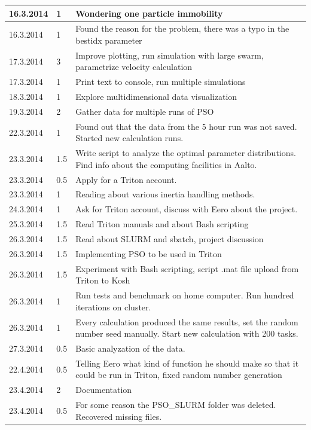 \documentclass[twoside]{article}
\begin{document}
\begin{longtable}{ | l | l | p{10cm} | }
	16.3.2014 & 1 & Wondering one particle immobility \\ \hline
	16.3.2014 & 1 & Found the reason for the problem, there was a typo in the bestidx parameter \\ \hline
	17.3.2014 & 3 & Improve plotting, run simulation with large swarm, parametrize velocity calculation \\ \hline
	17.3.2014 & 1 & Print text to console, run multiple simulations \\ \hline
	18.3.2014 & 1 & Explore multidimensional data visualization \\ \hline
	19.3.2014 & 2 & Gather data for multiple runs of PSO \\ \hline
	22.3.2014 & 1 & Found out that the data from the 5 hour run was not saved. Started new calculation runs. \\ \hline
	23.3.2014 & 1.5 & Write script to analyze the optimal parameter distributions. Find info about the computing facilities in Aalto. \\ \hline
	23.3.2014 & 0.5 & Apply for a Triton account. \\ \hline
	23.3.2014 & 1 & Reading about various inertia handling methods. \\ \hline
	24.3.2014 & 1 & Ask for Triton account, discuss with Eero about the project. \\ \hline
	25.3.2014 & 1.5 & Read Triton manuals and about Bash scripting \\ \hline
	26.3.2014 & 1.5 & Read about SLURM and sbatch, project discussion \\ \hline
	26.3.2014 & 1.5 & Implementing PSO to be used in Triton \\ \hline
	26.3.2014 & 1.5 & Experiment with Bash scripting, script .mat file upload from Triton to Kosh \\ \hline
	26.3.2014 & 1 & Run tests and benchmark on home computer. Run hundred iterations on cluster. \\ \hline
	26.3.2014 & 1 & Every calculation produced the same results, set the random number seed manually. Start new calculation with 200 tasks. \\ \hline
	27.3.2014 & 0.5 & Basic analyzation of the data. \\ \hline
	22.4.2014 & 0.5 & Telling Eero what kind of function he should make so that it could be run in Triton, fixed random number generation \\ \hline
	23.4.2014 & 2 & Documentation \\ \hline
	23.4.2014 & 0.5 & For some reason the PSO\_SLURM folder was deleted. Recovered missing files. \\ \hline

\end{longtable}
\end{document}
